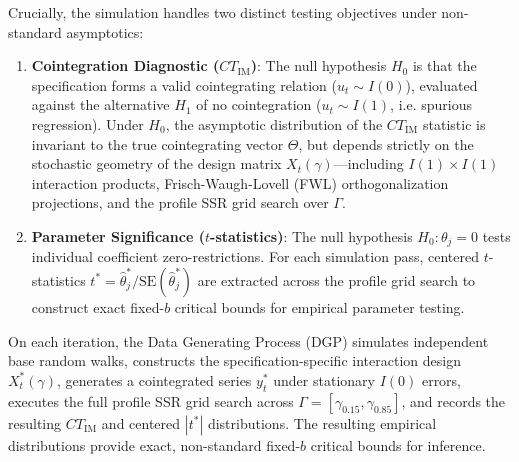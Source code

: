 Crucially, the simulation handles two distinct testing objectives under non-standard asymptotics:

\begin{enumerate}
	\item \textbf{Cointegration Diagnostic ($CT_{\text{IM}}$)}: The null hypothesis $H_0$ is that the specification forms a valid cointegrating relation ($u_t \sim I(0)$), evaluated against the alternative $H_1$ of no cointegration ($u_t \sim I(1)$, i.e. spurious regression). Under $H_0$, the asymptotic distribution of the $CT_{\text{IM}}$ statistic is invariant to the true cointegrating vector $\Theta$, but depends strictly on the stochastic geometry of the design matrix $X_t(\gamma)$---including $I(1) \times I(1)$ interaction products, Frisch-Waugh-Lovell (FWL) orthogonalization projections, and the profile SSR grid search over $\Gamma$.
	\item \textbf{Parameter Significance ($t$-statistics)}: The null hypothesis $H_0: \theta_j = 0$ tests individual coefficient zero-restrictions. For each simulation pass, centered $t$-statistics $t^* = \hat{\theta}_j^* / \text{SE}(\hat{\theta}_j^*)$ are extracted across the profile grid search to construct exact fixed-$b$ critical bounds for empirical parameter testing.
\end{enumerate}

On each iteration, the Data Generating Process (DGP) simulates independent base random walks, constructs the specification-specific interaction design $X_t^*(\gamma)$, generates a cointegrated series $y_t^*$ under stationary $I(0)$ errors, executes the full profile SSR grid search across $\Gamma = [\gamma_{0.15}, \gamma_{0.85}]$, and records the resulting $CT_{\text{IM}}$ and centered $|t^*|$ distributions. The resulting empirical distributions provide exact, non-standard fixed-$b$ critical bounds for inference.
